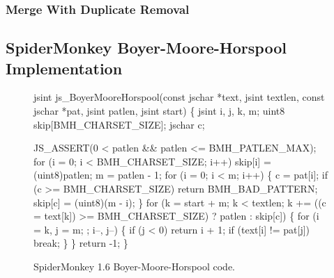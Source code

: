 \documentclass[conference]{IEEEtran}
\begin{document}
\subsubsection{Merge With Duplicate Removal}

\subsection{SpiderMonkey Boyer-Moore-Horspool Implementation}

\begin{figure}
{\scriptsize
\begin{code}
jsint
js\_BoyerMooreHorspool(const jschar *text, jsint textlen,
                      const jschar *pat, jsint patlen,
                      jsint start)
\{
  jsint i, j, k, m;
  uint8 skip[BMH\_CHARSET\_SIZE];
  jschar c;

  JS\_ASSERT(0 < patlen && patlen <= BMH\_PATLEN\_MAX);
  for (i = 0; i < BMH\_CHARSET\_SIZE; i++)
    skip[i] = (uint8)patlen;
  m = patlen - 1;
  for (i = 0; i < m; i++) \{
    c = pat[i];
    if (c >= BMH\_CHARSET\_SIZE)
      return BMH\_BAD\_PATTERN;
    skip[c] = (uint8)(m - i);
  \}
  for (k = start + m;
       k < textlen;
       k += ((c = text[k]) >= BMH\_CHARSET\_SIZE) ? 
             patlen : skip[c]) \{
    for (i = k, j = m; ; i--, j--) \{
      if (j < 0)
	return i + 1;
      if (text[i] != pat[j])
	break;
    \}
  \}
  return -1;
\}
\end{code}
}
\caption{SpiderMonkey 1.6 Boyer-Moore-Horspool code.}
\label{fig:bmh}
\end{figure}
\end{document}
